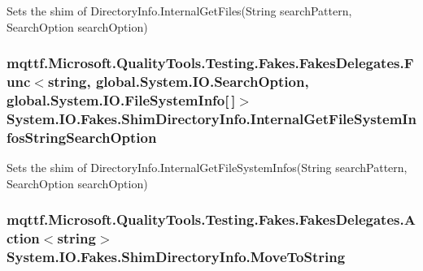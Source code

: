 Sets the shim of Directory\-Info.\-Internal\-Get\-Files(\-String search\-Pattern, Search\-Option search\-Option)

\hypertarget{class_system_1_1_i_o_1_1_fakes_1_1_shim_directory_info_a8aec4bf40a409d86967e743043183400}{
\subsubsection[{Internal\-Get\-File\-System\-Infos\-String\-Search\-Option}]{\setlength{\rightskip}{0pt plus 5cm}mqttf.\-Microsoft.\-Quality\-Tools.\-Testing.\-Fakes.\-Fakes\-Delegates.\-Func$<$string, global.\-System.\-I\-O.\-Search\-Option, global.\-System.\-I\-O.\-File\-System\-Info\mbox{[}$\,$\mbox{]}$>$ System.\-I\-O.\-Fakes.\-Shim\-Directory\-Info.\-Internal\-Get\-File\-System\-Infos\-String\-Search\-Option\hspace{0.3cm}{\ttfamily [set]}}}\label{class_system_1_1_i_o_1_1_fakes_1_1_shim_directory_info_a8aec4bf40a409d86967e743043183400}


Sets the shim of Directory\-Info.\-Internal\-Get\-File\-System\-Infos(\-String search\-Pattern, Search\-Option search\-Option)

\hypertarget{class_system_1_1_i_o_1_1_fakes_1_1_shim_directory_info_a4d7e3cffecc6c180fe695ee1b799b929}{
\subsubsection[{Move\-To\-String}]{\setlength{\rightskip}{0pt plus 5cm}mqttf.\-Microsoft.\-Quality\-Tools.\-Testing.\-Fakes.\-Fakes\-Delegates.\-Action$<$string$>$ System.\-I\-O.\-Fakes.\-Shim\-Directory\-Info.\-Move\-To\-String\hspace{0.3cm}{\ttfamily [set]}}}\label{class_system_1_1_i_o_1_1_fakes_1_1_shim_directory_info_a4d7e3cffecc6c180fe695ee1b799b929}


